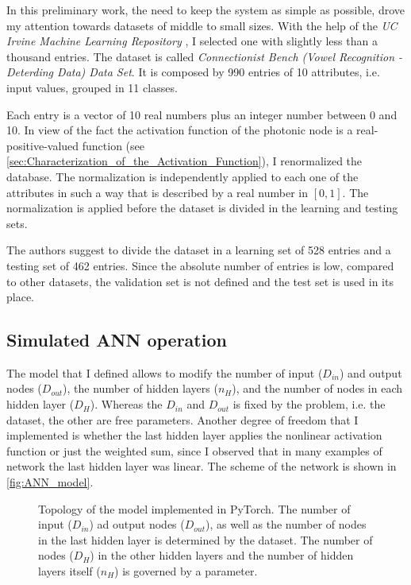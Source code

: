 In this preliminary work, the need to keep the system as simple as possible, drove my attention towards datasets of middle to small sizes.
With the help of the \textit{UC Irvine Machine Learning Repository} \cite{UCIMLR}, I selected one with slightly less than a thousand entries.
The dataset is called \textit{Connectionist Bench (Vowel Recognition - Deterding Data) Data Set}.
It is composed by \num{990} entries of \num{10} attributes, i.e. input values, grouped in \num{11} classes.

Each entry is a vector of \num{10} real numbers plus an integer number between \num{0} and \num{10}.
In view of the fact the activation function of the photonic node is a real-positive-valued function (see \autoref{sec:Characterization_of_the_Activation_Function}), I renormalized the database.
The normalization is independently applied to each one of the attributes in such a way that is described by a real number in $[0,1]$.
The normalization is applied before the dataset is divided in the learning and testing sets.

The authors suggest to divide the dataset in a learning set of \num{528} entries and a testing set of \num{462} entries.
Since the absolute number of entries is low, compared to other datasets, the validation set is not defined and the test set is used in its place.

\subsection{Simulated ANN operation}
\label{ssec:Simulated_ANN_operation}
The model that I defined allows to modify the number of input ($D_{in}$) and output nodes ($D_{out}$), the number of hidden layers ($n_{H}$), and the number of nodes in each hidden layer ($D_{H}$).
Whereas the $D_{in}$ and $D_{out}$ is fixed by the problem, i.e. the dataset, the other are free parameters.
Another degree of freedom that I implemented is whether the last hidden layer applies the nonlinear activation function or just the weighted sum, since I observed that in many examples of network the last hidden layer was linear.
The scheme of the network is shown in \autoref{fig:ANN_model}.

\begin{figure}[htbp]
	\centering
	
	\caption{Topology of the model implemented in PyTorch. The number of input ($D_{in}$) ad output nodes ($D_{out}$), as well as the number of nodes in the last hidden layer is determined by the dataset.
	The number of nodes ($D_{H}$) in the other hidden layers and the number of hidden layers itself ($n_{H}$) is governed by a parameter.}
	\label{fig:ANN_model}
\end{figure}

